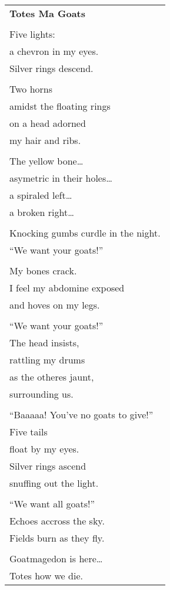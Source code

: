 \documentclass{article}
\begin{document}
\begin{center}
\begin{tabular}{l}
\textbf{Totes Ma Goats} \\
\\
Five lights: \\
a chevron in my eyes. \\
Silver rings descend. \\
\\
Two horns \\
amidst the floating rings \\
on a head adorned \\
my hair and ribs. \\
\\
The yellow bone\ldots \\
asymetric in their holes\ldots \\
a spiraled left\ldots \\
a broken right\ldots \\
\\
Knocking gumbs curdle in the night. \\
``We want your goats!'' \\
\\
My bones crack. \\
I feel my abdomine exposed \\
and hoves on my legs. \\
\\
``We want your goats!'' \\
The head insists, \\
rattling my drums \\
as the otheres jaunt, \\
surrounding us. \\
\\
``Baaaaa!  You've no goats to give!''
\\
Five tails \\
float by my eyes. \\
Silver rings ascend \\
snuffing out the light. \\
\\
``We want all goats!'' \\
Echoes accross the sky. \\
Fields burn as they fly. \\
\\
Goatmagedon is here\ldots \\
Totes how we die. \\
\end{tabular}
\end{center}
\end{document}
